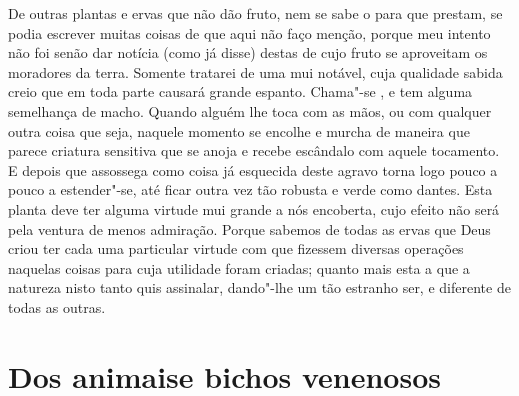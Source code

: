 De outras plantas e ervas que não dão fruto, nem se sabe o para que
prestam, se podia escrever muitas coisas de que aqui não faço menção,
porque meu intento não foi senão dar notícia (como já disse) destas de
cujo fruto se aproveitam os moradores da terra. Somente tratarei de uma
mui notável, cuja qualidade sabida creio que em toda parte causará
grande espanto. Chama"-se , e tem alguma semelhança de 
macho. Quando alguém lhe toca com as mãos, ou com qualquer outra coisa
que seja, naquele momento se encolhe e murcha de maneira que parece
criatura sensitiva que se anoja e recebe escândalo com aquele
tocamento. E depois que assossega como coisa já esquecida deste agravo
torna logo pouco a pouco a estender"-se, até ficar outra vez tão robusta
e verde como dantes. Esta planta deve ter alguma virtude mui grande a
nós encoberta, cujo efeito não será pela ventura de menos admiração.	%
Porque sabemos de todas as ervas que Deus criou ter cada uma particular
virtude com que fizessem diversas operações naquelas coisas para cuja	
utilidade foram criadas; quanto mais esta a que a natureza nisto tanto quis
assinalar, dando"-lhe um tão estranho ser, e diferente de todas as
outras.

\chapter[Dos animais e bichos venenosos]{Dos animais\break e bichos
venenosos}

